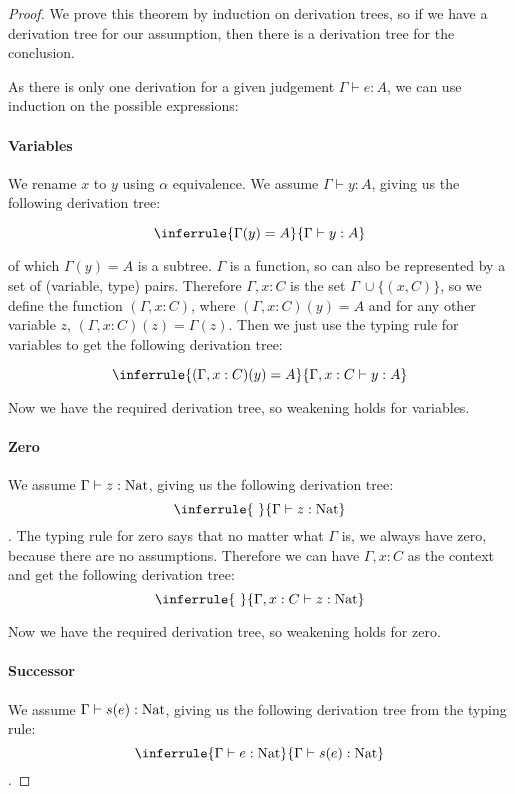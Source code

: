 \begin{proof}
We prove this theorem by induction on derivation trees, so if we have a derivation tree for our assumption, then there is a derivation tree for the conclusion.%



As there is only one derivation for a given judgement $\Gamma \vdash e : A$, we can use induction on the possible expressions:

\paragraph{Variables} We rename $x$ to $y$ using $\alpha$ equivalence. We assume $\Gamma \vdash y : A$, giving us the following derivation tree:

$$
\inferrule{\Gamma(y) = A}{\Gamma \vdash y : A}
$$ 

of which $\Gamma(y) = A$ is a subtree. $\Gamma$ is a function, so can also be represented by a set of (variable, type) pairs. Therefore $\Gamma, x: C$ is the set $\Gamma \ \cup \{(x,C)\}$, so we define the function $(\Gamma,x:C)$, where $(\Gamma,x:C)(y) = A$ and for any other variable $z$, $(\Gamma, x:C)(z) = \Gamma(z)$. Then we just use the typing rule for variables to get the following derivation tree:

$$
\inferrule{(\Gamma, x : C) (y) = A}{\Gamma, x : C \vdash y : A}
$$ 

Now we have the required derivation tree, so weakening holds for variables.

\paragraph{Zero} We assume $\Gamma \vdash z : \operatorname{Nat}$, giving us the following derivation tree:
$$
\inferrule{ \ }{\Gamma \vdash z : \nat}
$$.
The typing rule for zero says that no matter what $\Gamma$ is, we always have zero, because there are no assumptions. Therefore we can have $\Gamma, x: C$ as the context and get the following derivation tree:
$$
\inferrule{ \ }{\Gamma,x :C \vdash z : \nat}
$$

Now we have the required derivation tree, so weakening holds for zero.

\paragraph{Successor} We assume $\Gamma \vdash s(e) : \operatorname{Nat}$, giving us the following derivation tree from the typing rule:
$$
\inferrule{\Gamma \vdash e : \nat}{\Gamma \vdash s(e) : \nat}
$$.


\end{proof}
